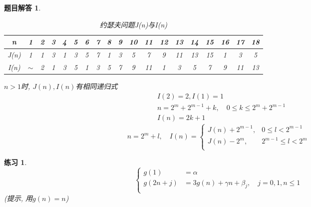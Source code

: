 \documentclass[mode=geye]{elegantnote}
\newtheorem{exercise}{练习}
\newtheorem{answer}{题目解答}
\begin{document}
\begin{answer}
	\begin{table}[htbp]
		\centering
		\small
		\caption{约瑟夫问题J(n)与I(n)}
		\begin{tabular}{c|c cc cccc cccccccc ccc}
			\toprule
			n 
			& 1 
			& 2 & 3 
			& 4 & 5 & 6 & 7 
			& 8 & 9 & 10 & 11 & 12 & 13 & 14 & 15 
			& 16 & 17 & 18 \\
			\midrule
			J(n) 
			& 1 
			& 1 & 3 
			& 1 & 3 & 5 & 7 
			& 1 & 3	& 5 & 7 & 9 & 11 & 13 & 15
			& 1 & 3 & 5 \\
			\midrule
			I(n) 
			& $\sim$ 
			& 2  
			& 1 & 3 & 5  
			& 1 & 3	& 5 & 7 & 9 & 11 
			& 1 & 3	& 5 & 7 & 9 & 11 &13 \\
			\bottomrule
		\end{tabular}%
		\label{tab:JNIN}%
	\end{table}%

$ n >1 $时,  $ J(n), I(n) $有相同递归式
\begin{align*}
	& I(2) = 2, I(1) = 1\\
	& n=2^m + 2^{m-1}+k, \quad 0\leqslant k \leqslant 2^m + 2^{m-1}\\
	& I(n) = 2k+1 
\end{align*}
\begin{equation*}
	n = 2^m + l ,\quad I(n) =
	\left\{
	\begin{array}{ll}
		J(n)+2^{m-1}, 	& 0 		\leqslant l < 2^{m-1} 	\\
		J(n)-2^{m}, 	& 2^{m-1}	\leqslant l < 2^{m} 	\\
	\end{array}
	\right.
\end{equation*}
\end{answer}

\begin{exercise}
	\begin{equation*}
		\left\{
		\begin{array}{rl}
			g(1) 	&= \alpha	\\
			g(2n+j)	&= 3g(n)+\gamma n + \beta_j, \quad j=0,1, n\leqslant 1\\
		\end{array}
		\right.
	\end{equation*}
(提示, 用$ g(n)=n $)
\end{exercise}
\end{document}
